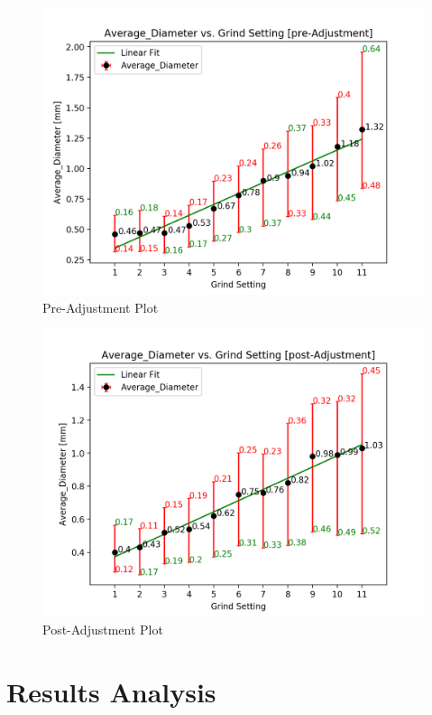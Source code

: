 \documentclass[10pt,a4paper,twocolumn,notitlepage]{article}
\begin{document}
\begin{center}\begin{figure}[h]
\includegraphics[width=\columnwidth]{preAdjustmentAverage_DiameterPlot.png}\caption{Pre-Adjustment Plot}\label{fig:preAdjustmentGraph}\end{figure}

\begin{figure}[h]
\includegraphics[width=\columnwidth]{postAdjustmentAverage_DiameterPlot.png}\caption{Post-Adjustment Plot}\label{fig:postAdjustmentGraph}\end{figure}\end{center}

\section{Results Analysis}
\end{document}
